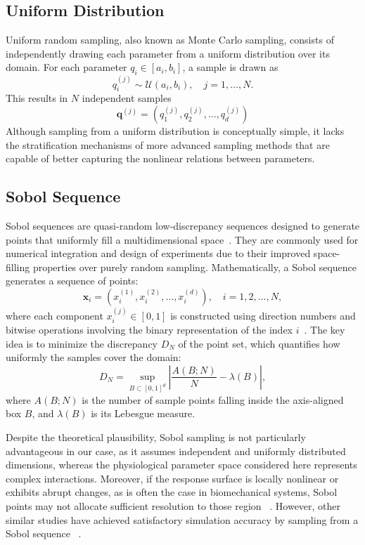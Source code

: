\documentclass[a4paper,11pt]{article}
\begin{document}
\subsection{Uniform Distribution}
Uniform random sampling, also known as Monte Carlo sampling, consists of independently drawing each parameter from a uniform distribution over its domain. For each parameter \( q_i \in [a_i, b_i] \), a sample is drawn as
\begin{equation}
q_i^{(j)} \sim \mathcal{U}(a_i, b_i), \quad j = 1, \dots, N.
\end{equation}
This results in \( N \) independent samples
\begin{equation}
\mathbf{q}^{(j)} = \left( q_1^{(j)}, q_2^{(j)}, \dots, q_d^{(j)} \right)
\end{equation}
Although sampling from a uniform distribution is conceptually simple, it lacks the stratification mechanisms of more advanced sampling methods that are capable of better capturing the nonlinear relations between parameters.
\subsection{Sobol Sequence}
Sobol sequences are quasi-random low-discrepancy sequences designed to generate points that uniformly fill a multidimensional space~\cite{lemieux}. They are commonly used for numerical integration and design of experiments due to their improved space-filling properties over purely random sampling.
Mathematically, a Sobol sequence generates a sequence of points:
\begin{equation}
\mathbf{x}_i = (x_i^{(1)}, x_i^{(2)}, \dots, x_i^{(d)}), \quad i = 1, 2, \dots, N,
\end{equation}
where each component \( x_i^{(j)} \in [0, 1] \) is constructed using direction numbers and bitwise operations involving the binary representation of the index \( i \)~\cite{joe2008constructing}. The key idea is to minimize the discrepancy \( D_N \) of the point set, which quantifies how uniformly the samples cover the domain:
\begin{equation}
D_N = \sup_{B \subset [0,1]^d} \left| \frac{A(B; N)}{N} - \lambda(B) \right|,
\end{equation}
where \( A(B; N) \) is the number of sample points falling inside the axis-aligned box \( B \), and \( \lambda(B) \) is its Lebesgue measure.

Despite the theoretical plausibility, Sobol sampling is not particularly advantageous in our case, as it assumes independent and uniformly distributed dimensions, whereas the physiological parameter space considered here represents complex interactions. Moreover, if the response surface is locally nonlinear or exhibits abrupt changes, as is often the case in biomechanical systems, Sobol points may not allocate sufficient resolution to those region~\cite{burhenne2011sampling} . However, other similar studies have achieved satisfactory simulation accuracy by sampling from a Sobol sequence ~\cite{noe2019gaussian}.
\end{document}
